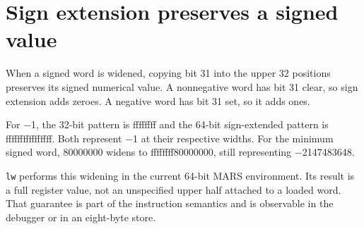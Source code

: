 \section{Sign extension preserves a signed
  value}\label{004-bit-inspector-p03-sign-extension-preserves-a-signed-value}

When a signed word is widened, copying bit 31 into the upper 32
positions preserves its signed numerical value. A nonnegative word has
bit 31 clear, so sign extension adds zeroes. A negative word has bit 31
set, so it adds ones.

For \ensuremath{-}1, the 32-bit pattern is ffffffff and the 64-bit sign-extended
pattern is ffffffffffffffff. Both represent \ensuremath{-}1 at their respective
widths. For the minimum signed word, 80000000 widens to
ffffffff80000000, still representing \ensuremath{-}2147483648.

\texttt{lw} performs this widening in the current 64-bit MARS
environment. Its result is a full register value, not an unspecified
upper half attached to a loaded word. That guarantee is part of the
instruction semantics and is observable in the debugger or in an
eight-byte store.
